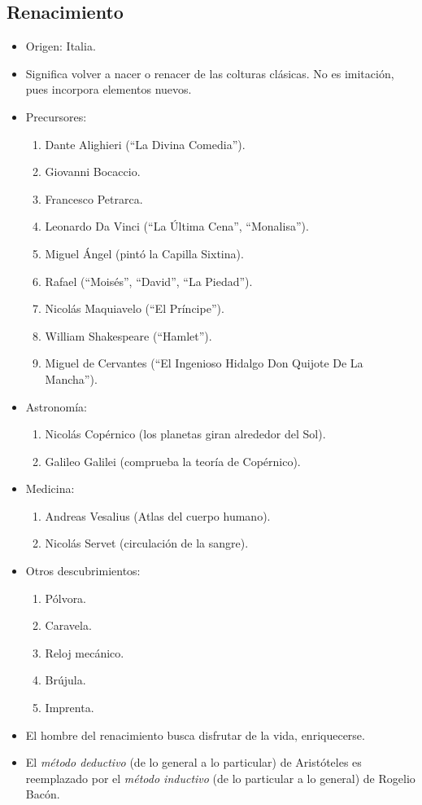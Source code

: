 \subsection{Renacimiento}

\begin{itemize}

\item Origen: Italia.

\item Significa volver a nacer o renacer de las colturas clásicas.
No es imitación, pues incorpora elementos nuevos.

\item Precursores:
\begin{enumerate}
	\item Dante Alighieri (``La Divina Comedia'').
	\item Giovanni Bocaccio.
	\item Francesco Petrarca.
	\item Leonardo Da Vinci (``La Última Cena'', ``Monalisa'').
	\item Miguel Ángel (pintó la Capilla Sixtina).
	\item Rafael (``Moisés'', ``David'', ``La Piedad'').
	\item Nicolás Maquiavelo (``El Príncipe'').
	\item William Shakespeare (``Hamlet'').
	\item Miguel de Cervantes (``El Ingenioso Hidalgo Don Quijote De La Mancha'').
\end{enumerate}

\item Astronomía:
\begin{enumerate}
	\item Nicolás Copérnico (los planetas giran alrededor del Sol).
	\item Galileo Galilei (comprueba la teoría de Copérnico).
\end{enumerate}

\item Medicina:
\begin{enumerate}
	\item Andreas Vesalius (Atlas del cuerpo humano).
	\item Nicolás Servet (circulación de la sangre).
\end{enumerate}

\item Otros descubrimientos:
\begin{enumerate}
	\item Pólvora.
	\item Caravela.
	\item Reloj mecánico.
	\item Brújula.
	\item Imprenta.
\end{enumerate}

\item El hombre del renacimiento busca disfrutar de la vida, enriquecerse.

\item El \emph{método deductivo} (de lo general a lo particular) de Aristóteles es reemplazado por el \emph{método inductivo} (de lo particular a lo general) de Rogelio Bacón.

\end{itemize}